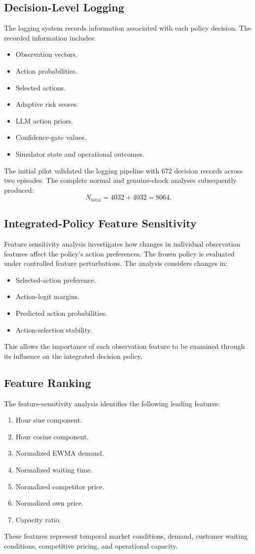 \documentclass[conference]{IEEEtran}
\begin{document}
\subsection{Decision-Level Logging}
The logging system records information associated with each policy decision. The recorded information includes:
\begin{itemize}
  \item Observation vectors.
  \item Action probabilities.
  \item Selected actions.
  \item Adaptive risk scores.
  \item LLM action priors.
  \item Confidence-gate values.
  \item Simulator state and operational outcomes.
\end{itemize}
The initial pilot validated the logging pipeline with 672 decision records across two episodes. The complete normal and genuine-shock analyses subsequently produced:
\begin{equation}
  N_{\mathrm{total}} = 4032 + 4032 = 8064.
\end{equation}

\subsection{Integrated-Policy Feature Sensitivity}
Feature sensitivity analysis investigates how changes in individual observation features affect the policy's action preferences. The frozen policy is evaluated under controlled feature perturbations. The analysis considers changes in:
\begin{itemize}
  \item Selected-action preference.
  \item Action-logit margins.
  \item Predicted action probabilities.
  \item Action-selection stability.
\end{itemize}
This allows the importance of each observation feature to be examined through its influence on the integrated decision policy.

\subsection{Feature Ranking}
The feature-sensitivity analysis identifies the following leading features:
\begin{enumerate}
  \item Hour sine component.
  \item Hour cosine component.
  \item Normalized EWMA demand.
  \item Normalized waiting time.
  \item Normalized competitor price.
  \item Normalized own price.
  \item Capacity ratio.
\end{enumerate}
These features represent temporal market conditions, demand, customer waiting conditions, competitive pricing, and operational capacity.
\end{document}
